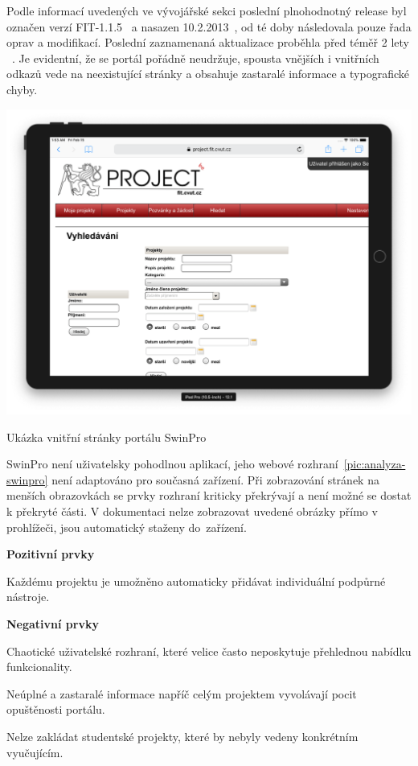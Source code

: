 Podle informací uvedených ve vývojářské sekci poslední plnohodnotný release byl označen verzí FIT-1.1.5~\cite{swinproDevpage} a nasazen 10.2.2013~\cite{swinproDevpage1645}, od té doby následovala pouze řada oprav a modifikací. Poslední zaznamenaná aktualizace proběhla před téměř 2 lety ~\cite{swinproDevpage1907}. Je evidentní, že se portál pořádně neudržuje, spousta vnějších i vnitřních odkazů vede na neexistující stránky a obsahuje zastaralé informace a typografické chyby.


\begin{fig:illustration}
   \includegraphics[width=1\textwidth]{images/analyza-swinpro.png}
   \caption{Ukázka vnitřní stránky portálu SwinPro}\label{pic:analyza-swinpro}
\end{fig:illustration}

SwinPro není uživatelsky pohodlnou aplikací, jeho webové rozhraní~\ref{pic:analyza-swinpro} není adaptováno pro současná zařízení. Při zobrazování stránek na menších obrazovkách se prvky rozhraní kriticky překrývají a není možné se dostat k překryté části. V dokumentaci nelze zobrazovat uvedené obrázky přímo v prohlížeči, jsou automatický staženy do~zařízení.

\textbf{Pozitivní prvky}
\begin{ul}
   \item Každému projektu je umožněno automaticky přidávat individuální podpůrné nástroje.
\end{ul}

\textbf{Negativní prvky}
\begin{ul}
   \item Chaotické uživatelské rozhraní, které velice často neposkytuje přehlednou nabídku funkcionality.
   \item Neúplné a zastaralé informace napříč celým projektem vyvolávají pocit opuštěnosti portálu.
   \item Nelze zakládat studentské projekty, které by nebyly vedeny konkrétním vyučujícím.
\end{ul}


